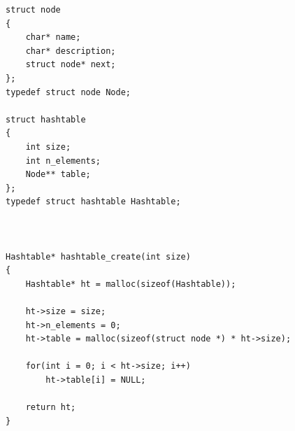 \documentclass{article}
\begin{document}
\begin{multicols}{2}
\begin{lstlisting}
struct node 
{
    char* name;
    char* description;
    struct node* next;
};
typedef struct node Node;

struct hashtable 
{
    int size;
    int n_elements;
    Node** table;
};
typedef struct hashtable Hashtable;



Hashtable* hashtable_create(int size)
{
    Hashtable* ht = malloc(sizeof(Hashtable));

    ht->size = size;
    ht->n_elements = 0;
    ht->table = malloc(sizeof(struct node *) * ht->size);

    for(int i = 0; i < ht->size; i++) 
        ht->table[i] = NULL;

    return ht;
}

\end{lstlisting}
\end{multicols}
\end{document}
